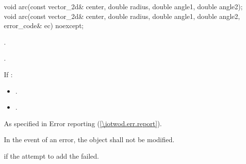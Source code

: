 \begin{itemdecl}
    void arc(const vector_2d& center, double radius, double angle1,
      double angle2);
    void arc(const vector_2d& center, double radius, double angle1,
      double angle2, error_code& ec) noexcept;
\end{itemdecl}
\begin{itemdescr}
	\pnum
	\effects
	.
	
	\pnum
	.
	
	\pnum
	If :
	\begin{itemize}
	\item {}.
	
	\item {}.
	\end{itemize}
	
	\pnum
	\throws
	As specified in Error reporting (\ref{\iotwod.err.report}).

	\pnum
	\remarks
	In the event of an error, the object shall not be modified.

	\pnum
	\errors
	 if the attempt to add the  failed.
\end{itemdescr}

